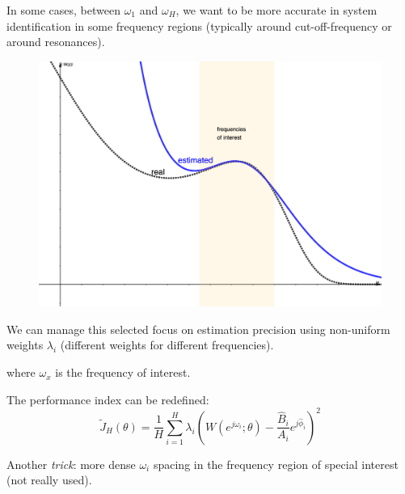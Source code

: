 \begin{remark}
    In some cases, between $\omega_1$ and $\omega_H$, we want to be more accurate in system identification in some frequency regions (typically around cut-off-frequency or around resonances).
    
    \begin{figure}[H]
        \centering
        \includegraphics[scale=4.5]{./img/freq-emphasis.png}
    \end{figure}

    We can manage this selected focus on estimation precision using non-uniform weights $\lambda_i$ (different weights for different frequencies).

    \begin{figure}[H]
        \centering
    \end{figure}
    
    where $\omega_x$ is the frequency of interest.
    
    
    The performance index can be redefined:
    \[
        \tilde{J}_H (\theta) = \frac{1}{H} \sum_{i=1}^H \lambda_i \left(W(e^{j\omega_i};\theta) - \frac{\hat{B}_i}{A_i}e^{j\hat{\phi}_i}\right)^2
    \]

    Another \emph{trick}: more dense $\omega_i$ spacing in the frequency region of special interest (not really used).
\end{remark}


